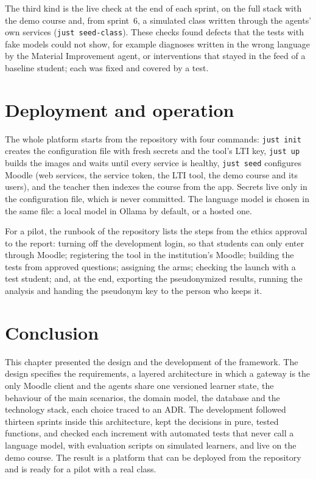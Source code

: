 The third kind is the live check at the end of each sprint, on the full
stack with the demo course and, from sprint~6, a simulated class written
through the agents' own services (\texttt{just seed-class}). These checks
found defects that the tests with fake models could not show, for
example diagnoses written in the wrong language by the Material
Improvement agent, or interventions that stayed in the feed of a
baseline student; each was fixed and covered by a test.

\section{Deployment and operation}
\label{sec-d-deploy}

The whole platform starts from the repository with four commands:
\texttt{just init} creates the configuration file with fresh secrets and
the tool's LTI key, \texttt{just up} builds the images and waits until
every service is healthy, \texttt{just seed} configures Moodle (web
services, the service token, the LTI tool, the demo course and its
users), and the teacher then indexes the course from the app. Secrets
live only in the configuration file, which is never committed. The
language model is chosen in the same file: a local model in Ollama by
default, or a hosted one.

For a pilot, the runbook of the repository lists the steps from the
ethics approval to the report: turning off the development login, so
that students can only enter through Moodle; registering the tool in the
institution's Moodle; building the tests from approved questions;
assigning the arms; checking the launch with a test student; and, at the
end, exporting the pseudonymized results, running the analysis and
handing the pseudonym key to the person who keeps it.

\section*{Conclusion}

This chapter presented the design and the development of the framework.
The design specifies the requirements, a layered architecture in which a
gateway is the only Moodle client and the agents share one versioned
learner state, the behaviour of the main scenarios, the domain model,
the database and the technology stack, each choice traced to an ADR. The
development followed thirteen sprints inside this architecture, kept the
decisions in pure, tested functions, and checked each increment with
automated tests that never call a language model, with evaluation
scripts on simulated learners, and live on the demo course. The result
is a platform that can be deployed from the repository and is ready for
a pilot with a real class.
